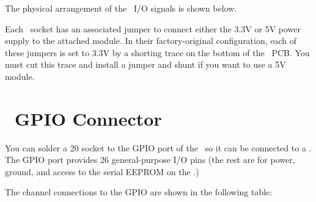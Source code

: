 \documentclass[letterpaper,11pt,oneside]{memoir}
\begin{document}
\pagebreak %

The physical arrangement of the \digpmod\ I/O signals is shown below.


Each \digpmod\ socket has an associated jumper to connect either the 3.3V or 5V power
supply to the attached module. 
In their factory-original configuration, each of these jumpers is set to 3.3V 
by a shorting trace on the bottom of the \product\ PCB. 
You must cut this trace and install a jumper and shunt if you want to use a 5V module.



\section{\rpi\ GPIO Connector}

You can solder a 20 socket to the GPIO port of the \product\ 
so it can be connected to a \rpi.
The GPIO port provides 26 general-purpose I/O pins (the rest are for power, ground,
and access to the serial EEPROM on the \product.)


\pagebreak %

The channel connections to the GPIO are shown in the following table:
\end{document}
